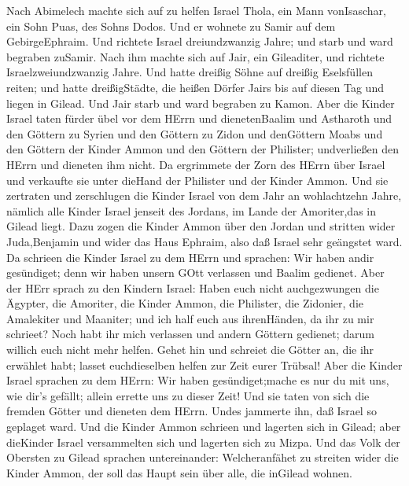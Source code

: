 Nach Abimelech machte sich auf zu helfen Israel Thola, ein
Mann vonIsaschar, ein Sohn Puas, des Sohns Dodos. Und er wohnete zu
Samir auf dem GebirgeEphraim.  Und richtete Israel
dreiundzwanzig Jahre; und starb und ward begraben zuSamir. 
Nach ihm machte sich auf Jair, ein Gileaditer, und richtete
Israelzweiundzwanzig Jahre.  Und hatte dreißig Söhne auf
dreißig Eselsfüllen reiten; und hatte dreißigStädte, die heißen Dörfer
Jairs bis auf diesen Tag und liegen in Gilead.  Und Jair
starb und ward begraben zu Kamon.  Aber die Kinder Israel
taten fürder übel vor dem HErrn und dienetenBaalim und Astharoth und den
Göttern zu Syrien und den Göttern zu Zidon und denGöttern Moabs und den
Göttern der Kinder Ammon und den Göttern der Philister; undverließen den
HErrn und dieneten ihm nicht.  Da ergrimmete der Zorn des
HErrn über Israel und verkaufte sie unter dieHand der Philister und der
Kinder Ammon.  Und sie zertraten und zerschlugen die Kinder
Israel von dem Jahr an wohlachtzehn Jahre, nämlich alle Kinder Israel
jenseit des Jordans, im Lande der Amoriter,das in Gilead liegt.
 Dazu zogen die Kinder Ammon über den Jordan und stritten
wider Juda,Benjamin und wider das Haus Ephraim, also daß Israel sehr
geängstet ward.  Da schrieen die Kinder Israel zu dem HErrn
und sprachen: Wir haben andir gesündiget; denn wir haben unsern GOtt
verlassen und Baalim gedienet.  Aber der HErr sprach zu den
Kindern Israel: Haben euch nicht auchgezwungen die Ägypter, die
Amoriter, die Kinder Ammon, die Philister,  die Zidonier,
die Amalekiter und Maaniter; und ich half euch aus ihrenHänden, da ihr
zu mir schrieet?  Noch habt ihr mich verlassen und andern
Göttern gedienet; darum willich euch nicht mehr helfen. 
Gehet hin und schreiet die Götter an, die ihr erwählet habt; lasset
euchdieselben helfen zur Zeit eurer Trübsal!  Aber die
Kinder Israel sprachen zu dem HErrn: Wir haben gesündiget;mache es nur
du mit uns, wie dir's gefällt; allein errette uns zu dieser Zeit!
 Und sie taten von sich die fremden Götter und dieneten dem
HErrn. Undes jammerte ihn, daß Israel so geplaget ward. 
Und die Kinder Ammon schrieen und lagerten sich in Gilead; aber
dieKinder Israel versammelten sich und lagerten sich zu Mizpa.
 Und das Volk der Obersten zu Gilead sprachen
untereinander: Welcheranfähet zu streiten wider die Kinder Ammon, der
soll das Haupt sein über alle, die inGilead wohnen.


